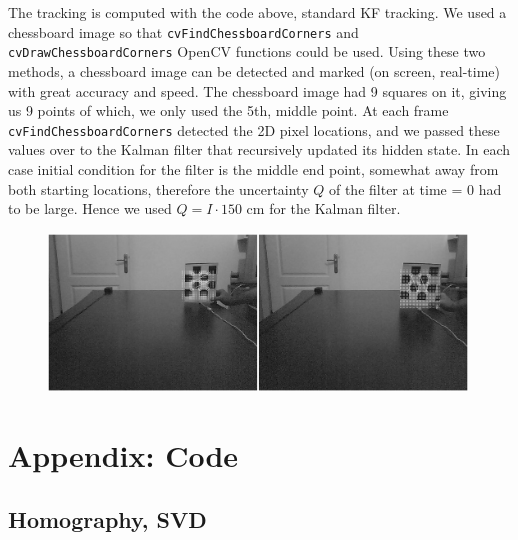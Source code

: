 \documentclass{article}
\begin{document}
The tracking is computed with the code above, standard KF tracking. We used a
chessboard image so that \verb!cvFindChessboardCorners! and
\verb!cvDrawChessboardCorners! OpenCV functions could be used. Using these two
methods, a chessboard image can be detected and marked (on screen, real-time)
with great accuracy and speed. The chessboard image had 9 squares on it, giving
us 9 points of which, we only used the 5th, middle point. At each frame
\verb!cvFindChessboardCorners! detected the 2D pixel locations, and we passed
these values over to the Kalman filter that recursively updated its hidden
state. In each case initial condition for the filter is the middle end point,
somewhat away from both starting locations, therefore the uncertainty $Q$ of the
filter at time = 0 had to be large. Hence we used $Q = I \cdot 150$ cm for the
Kalman filter.


\begin{figure}[h]
  \centering
  \includegraphics[width=30em]{kf4.jpg}
\end{figure}


\section{Appendix: Code}

\subsection{Homography, SVD}
\end{document}
